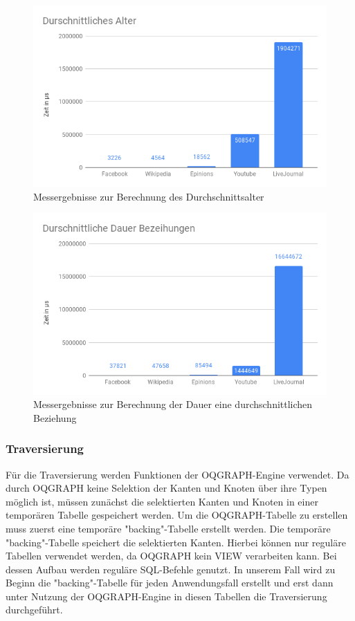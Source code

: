 \begin{figure}[h!]
	\centering
	\includegraphics[width=\textwidth]{images/DurschAlter.png}
	\caption{Messergebnisse zur Berechnung des Durchschnittsalter}
	\label{fig:DurschAlter}
\end{figure}

\begin{figure}[h!]
	\centering
	\includegraphics[width=\textwidth]{images/DurschBeziehung.png}
	\caption{Messergebnisse zur Berechnung der Dauer eine durchschnittlichen Beziehung}
	\label{fig:DurschBeziehung}
\end{figure}

\phantom{Platzhalter wegen verwirrender Figure-Platzierung}

\subsubsection{Traversierung}
Für die Traversierung werden Funktionen der OQGRAPH-Engine verwendet. Da durch OQGRAPH keine Selektion der Kanten und Knoten über ihre Typen möglich ist, müssen zunächst die selektierten Kanten und Knoten in einer temporären Tabelle gespeichert werden. Um die OQGRAPH-Tabelle zu erstellen muss zuerst eine temporäre "backing"-Tabelle erstellt werden. Die temporäre "backing"-Tabelle speichert die selektierten Kanten. Hierbei können nur reguläre Tabellen verwendet werden, da OQGRAPH kein VIEW verarbeiten kann. Bei dessen Aufbau werden reguläre SQL-Befehle genutzt. In unserem Fall wird zu Beginn die "backing"-Tabelle für jeden Anwendungsfall erstellt und erst dann unter Nutzung der OQGRAPH-Engine in diesen Tabellen die Traversierung durchgeführt.

